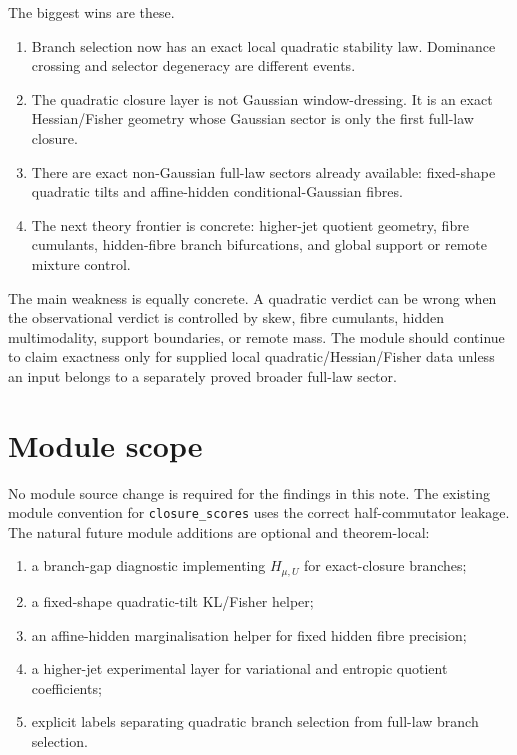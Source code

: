 \documentclass[11pt,a4paper]{article}
\numberwithin{equation}{section}
\theoremstyle{thmcompact}
\theoremstyle{remark}
\begin{document}
The biggest wins are these.

\begin{enumerate}
\item Branch selection now has an exact local quadratic stability law. Dominance crossing and selector degeneracy are different events.
\item The quadratic closure layer is not Gaussian window-dressing. It is an exact Hessian/Fisher geometry whose Gaussian sector is only the first full-law closure.
\item There are exact non-Gaussian full-law sectors already available: fixed-shape quadratic tilts and affine-hidden conditional-Gaussian fibres.
\item The next theory frontier is concrete: higher-jet quotient geometry, fibre cumulants, hidden-fibre branch bifurcations, and global support or remote mixture control.
\end{enumerate}

The main weakness is equally concrete. A quadratic verdict can be wrong when the observational verdict is controlled by skew, fibre cumulants, hidden multimodality, support boundaries, or remote mass. The module should continue to claim exactness only for supplied local quadratic/Hessian/Fisher data unless an input belongs to a separately proved broader full-law sector.

\section{Module scope}

No module source change is required for the findings in this note. The existing module convention for \texttt{closure\_scores} uses the correct half-commutator leakage. The natural future module additions are optional and theorem-local:

\begin{enumerate}
\item a branch-gap diagnostic implementing $H_{\mu,U}$ for exact-closure branches;
\item a fixed-shape quadratic-tilt KL/Fisher helper;
\item an affine-hidden marginalisation helper for fixed hidden fibre precision;
\item a higher-jet experimental layer for variational and entropic quotient coefficients;
\item explicit labels separating quadratic branch selection from full-law branch selection.
\end{enumerate}
\end{document}
